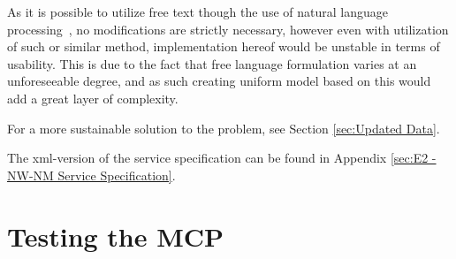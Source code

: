 As it is possible to utilize free text though the use of natural language processing~\cite{nlp}, no modifications are strictly necessary, however even with utilization of such or similar method, implementation hereof would be unstable in terms of usability. This is due to the fact that free language formulation varies at an unforeseeable degree, and as such creating uniform model based on this would add a great layer of complexity.

For a more sustainable solution to the problem, see Section \ref{sec:Updated Data}.

The xml-version of the service specification can be found in Appendix \ref{sec:E2 - NW-NM Service Specification}.

\section{Testing the MCP}

